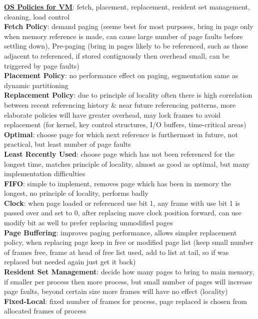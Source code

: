 \documentclass[a4paper]{article}
\begin{document}
\begin{multicols}{2}
        \underline{\textbf{OS Policies for VM}}: fetch, placement, replacement, resident set management, cleaning, load control\\
        \textbf{Fetch Policy}: demand paging (seeme best for most purposes, bring in page only when memory reference is made, can cause large number of page faults before settling down), Pre-paging (bring in pages likely to be referenced, such as those adjacent to referenced, if stored contiguously then overhead small, can be triggered by page faults)\\
        \textbf{Placement Policy}: no performance effect on paging, segmentation same as dynamic partitioning\\
        \textbf{Replacement Policy}: due to principle of locality often there is high correlation between recent referencing history \& near future referencing patterns, more elaborate policies will have greater overhead, may lock frames to avoid replacement (for kernel, key control structures, I/O buffers, time-critical areas)\\
        \textbf{Optimal}: choose page for which next reference is furthermost in future, not practical, but least number of page faults\\
        \textbf{Least Recently Used}: choose page which has not been referenced for the longest time, matches principle of locality, almost as good as optimal, but many implementation difficulties\\
        \textbf{FIFO}: simple to implement, removes page which has been in memory the longest, no principle of locality, performs badly\\
        \textbf{Clock}: when page loaded or referenced use bit 1, any frame with use bit 1 is passed over and set to 0, after replacing move clock position forward, can use modify bit as well to prefer replacing unmodified pages\\
        \textbf{Page Buffering}: improves paging performance, allows simpler replacement policy, when replacing page keep in free or modified page list (keep small number of frames free, frame at head of free list used, add to list at tail, so if was replaced but needed again just get it back)\\
        \textbf{Resident Set Management}: decide how many pages to bring to main memory, if smaller per process then more process, but small number of pages will increase page faults, beyond certain size more frames will have no effect (locality)\\
        \textbf{Fixed-Local}: fixed number of frames for process, page replaced is chosen from allocated frames of process\\

\end{multicols}
\end{document}
